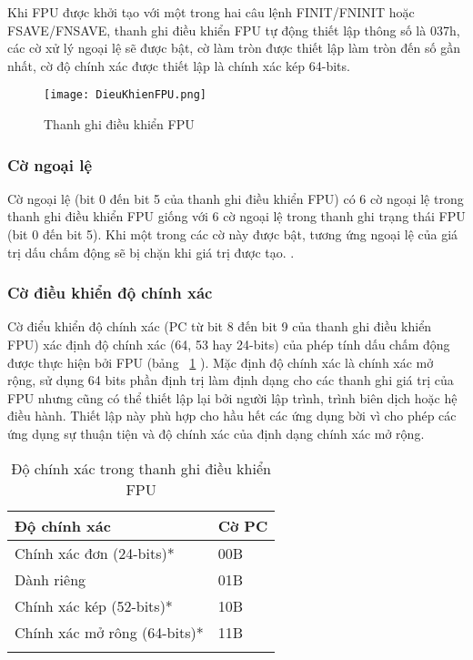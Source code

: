 	Khi FPU được khởi tạo với một trong hai câu lệnh FINIT/FNINIT hoặc FSAVE/FNSAVE, thanh ghi điều khiển FPU tự động thiết lập thông số là 037h, các cờ xử lý ngoại lệ sẽ được bật, cờ làm tròn được thiết lập làm tròn đến số gần nhất, cờ độ chính xác được thiết lập là chính xác kép 64-bits.
		\begin{center}
			\begin{figure}[htp]
				\begin{center}
					\texttt{[image: DieuKhienFPU.png]}
				\end{center}
				\caption{Thanh ghi điều khiển FPU}				
				\label{fig:DieuKhienFPU}				
			\end{figure}
		\end{center}	

		\subsubsection*{ Cờ ngoại lệ}
	Cờ ngoại lệ (bit 0 đến bit 5 của thanh ghi điều khiển FPU) có 6 cờ ngoại lệ trong thanh ghi điều khiển FPU giống với 6 cờ ngoại lệ trong thanh ghi trạng thái FPU (bit 0 đến bit 5). Khi một trong các cờ này được bật, tương ứng ngoại lệ của giá trị dấu chấm động sẽ bị chặn khi giá trị được tạo.
.
	\subsubsection*{ Cờ điều khiển độ chính xác}
	Cờ điểu khiển độ chính xác (PC từ bit 8 đến bit 9 của thanh ghi điều khiển FPU) xác định độ chính xác (64, 53 hay 24-bits) của phép tính dấu chấm động được thực hiện bởi FPU (bảng ~\ref{tb:DoChinhXac} ). Mặc định độ chính xác là chính xác mở rộng, sử dụng 64 bits phần định trị làm định dạng cho các thanh ghi giá trị của FPU nhưng cũng có thể thiết lập lại bởi người lập trình, trình biên dịch hoặc hệ điều hành. Thiết lập này phù hợp cho hầu hết các ứng dụng bời vì cho phép các ứng dụng sự thuận tiện và độ chính xác của định dạng chính xác mở rộng.
	\begin{longtable}{|m{6cm}|m{4cm}|}
		\hline
			Độ chính xác & Cờ PC \\
		\hline
		\hline
		Chính xác đơn (24-bits)* & 00B \\
		\hline
		Dành riêng  & 01B \\
		\hline
		Chính xác kép (52-bits)* & 10B \\
		\hline
		Chính xác mở rông (64-bits)* & 11B \\
		\hline	
		\caption{Độ chính xác trong thanh ghi điều khiển FPU}
		\label{tb:DoChinhXac}
	\end{longtable}
	
